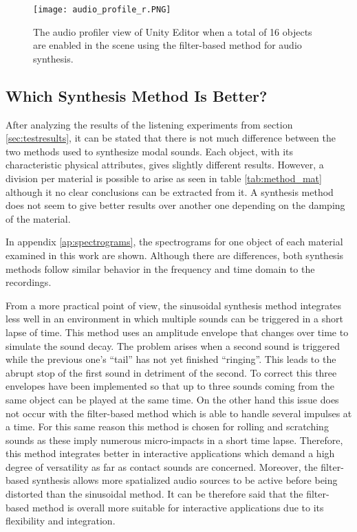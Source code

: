 \begin{figure}[H]
  \centering
    \texttt{[image: audio\_profile\_r.PNG]}
      \caption{The audio profiler view of Unity\textsuperscript{\textregistered} Editor when a total of 16 objects are enabled in the scene using the filter-based method for audio synthesis.}
      \label{fig:audio_profile}
\end{figure}

\subsection{Which Synthesis Method Is Better?}
After analyzing the results of the listening experiments from section \ref{sec:testresults}, it can be stated that there is not much difference between the two methods used to synthesize modal sounds. Each object, with its characteristic physical attributes, gives slightly different results. However, a division per material is possible to arise as seen in table \ref{tab:method_mat} although it no clear conclusions can be extracted from it. A synthesis method does not seem to give better results over another one depending on the damping of the material.

In appendix \ref{ap:spectrograms}, the spectrograms for one object of each material examined in this work are shown. Although there are differences, both synthesis methods follow similar behavior in the frequency and time domain to the recordings.

From a more practical point of view, the sinusoidal synthesis method integrates less well in an environment in which multiple sounds can be triggered in a short lapse of time. This method uses an amplitude envelope that changes over time to simulate the sound decay. The problem arises when a second sound is triggered while the previous one's ``tail'' has not yet finished ``ringing''. This leads to the abrupt stop of the first sound in detriment of the second. To correct this three envelopes have been implemented so that up to three sounds coming from the same object can be played at the same time. On the other hand this issue does not occur with the filter-based method which is able to handle several impulses at a time. For this same reason this method is chosen for rolling and scratching sounds as these imply numerous micro-impacts in a short time lapse. Therefore, this method integrates better in interactive applications which demand a high degree of versatility as far as contact sounds are concerned. Moreover,  the filter-based synthesis allows more spatialized audio sources to be active before being distorted than the sinusoidal method. It can be therefore said that the filter-based method is overall more suitable for interactive applications due to its flexibility and integration.


